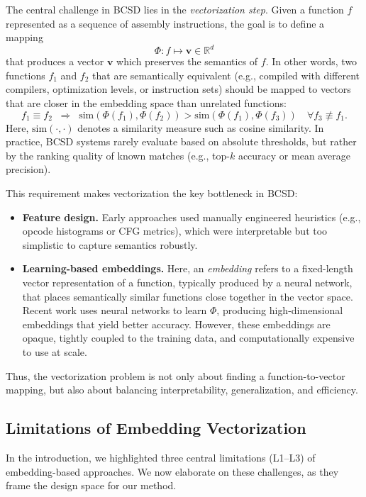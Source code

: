 The central challenge in BCSD lies in the \emph{vectorization step}. Given a function $f$ represented as a sequence of assembly instructions, the goal is to define a mapping
\[
    \Phi : f \mapsto \mathbf{v} \in \mathbb{R}^d
\]
that produces a vector $\mathbf{v}$ which preserves the semantics of $f$.  
In other words, two functions $f_1$ and $f_2$ that are semantically equivalent (e.g., compiled with different compilers, optimization levels, or instruction sets) should be mapped to vectors that are closer in the embedding space than unrelated functions:
\[
    f_1 \equiv f_2 \;\;\Rightarrow\;\; \text{sim}(\Phi(f_1), \Phi(f_2)) > \text{sim}(\Phi(f_1), \Phi(f_3)) \quad \forall f_3 \not\equiv f_1.
\]
Here, $\text{sim}(\cdot,\cdot)$ denotes a similarity measure such as cosine similarity.  
In practice, BCSD systems rarely evaluate based on absolute thresholds, but rather by the ranking quality of known matches (e.g., top-$k$ accuracy or mean average precision).

This requirement makes vectorization the key bottleneck in BCSD:
\begin{itemize}
    \item \textbf{Feature design.} Early approaches used manually engineered heuristics (e.g., opcode histograms or CFG metrics), which were interpretable but too simplistic to capture semantics robustly.
    \item \textbf{Learning-based embeddings.} Here, an \emph{embedding} refers to a fixed-length vector representation of a function, typically produced by a neural network, that places semantically similar functions close together in the vector space. Recent work uses neural networks to learn $\Phi$, producing high-dimensional embeddings that yield better accuracy. However, these embeddings are opaque, tightly coupled to the training data, and computationally expensive to use at scale.
\end{itemize}

Thus, the vectorization problem is not only about finding a function-to-vector mapping, but also about balancing interpretability, generalization, and efficiency.



\subsection{Limitations of Embedding Vectorization}

In the introduction, we highlighted three central limitations (L1–L3) of embedding-based approaches. We now elaborate on these challenges, as they frame the design space for our method.


